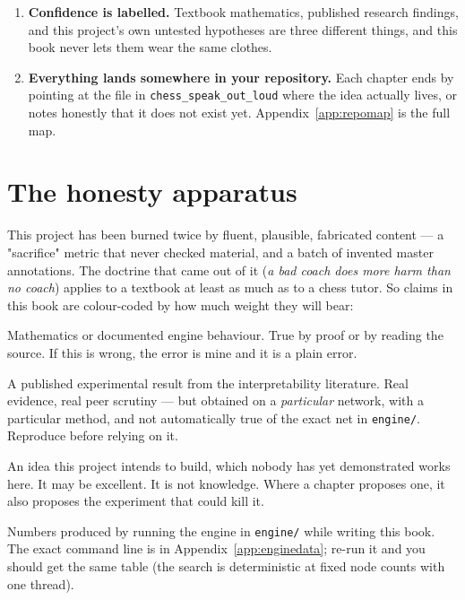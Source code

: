\begin{enumerate}
\item \textbf{Confidence is labelled.} Textbook mathematics, published research findings,
  and this project's own untested hypotheses are three different things, and this book
  never lets them wear the same clothes.

\item \textbf{Everything lands somewhere in your repository.} Each chapter ends by pointing
  at the file in \texttt{chess\_speak\_out\_loud} where the idea actually lives, or notes
  honestly that it does not exist yet. Appendix~\ref{app:repomap} is the full map.
\end{enumerate}

\section*{The honesty apparatus}

This project has been burned twice by fluent, plausible, fabricated content --- a
"sacrifice" metric that never checked material, and a batch of invented master annotations.
The doctrine that came out of it (\emph{a bad coach does more harm than no coach}) applies
to a textbook at least as much as to a chess tutor. So claims in this book are colour-coded
by how much weight they will bear:

\begin{established}
Mathematics or documented engine behaviour. True by proof or by reading the source. If
this is wrong, the error is mine and it is a plain error.
\end{established}

\begin{researchfinding}
A published experimental result from the interpretability literature. Real evidence, real
peer scrutiny --- but obtained on a \emph{particular} network, with a particular method, and
not automatically true of the exact net in \texttt{engine/}. Reproduce before relying on it.
\end{researchfinding}

\begin{hypothesis}
An idea this project intends to build, which nobody has yet demonstrated works here. It
may be excellent. It is not knowledge. Where a chapter proposes one, it also proposes the
experiment that could kill it.
\end{hypothesis}

\begin{realdata}
Numbers produced by running the engine in \texttt{engine/} while writing this book. The
exact command line is in Appendix~\ref{app:enginedata}; re-run it and you should get the
same table (the search is deterministic at fixed node counts with one thread).
\end{realdata}

